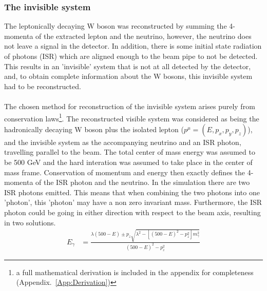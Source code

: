 \subsubsection{The invisible system}
\label{SUBSUBSEC:ISRImplementation}
The leptonically decaying W boson was reconstructed by summing the 4-momenta of the extracted lepton and the neutrino, however, the neutrino does not leave a signal in the detector. In addition, there is some initial state radiation of photons (ISR) which are aligned enough to the beam pipe to not be detected. This results in an 'invisible' system that is not at all detected by the detector, and, to obtain complete information about the W bosons, this invisible system had to be reconstructed.
\\\\
The chosen method for reconstruction of the invisible system arises purely from conservation laws\footnote{ a full mathematical derivation is included in the appendix for completeness (Appendix.~\ref{App:Derivation})}. The reconstructed visible system was considered as being the hadronically decaying W boson plus the isolated lepton (${p}^{\mu} = ( E,  {p}_{x}, {p}_{y}, {p}_{z})$), and the invisible system as the accompanying neutrino and an ISR photon, travelling parallel to the beam. The total center of mass energy was assumed to be 500 GeV and the hard interation was assumed to take place in the center of mass frame. Conservation of momentum and energy then exactly defines the 4-momenta of the ISR photon and the neutrino. In the simulation there are two ISR photons emitted. This means that when combining the two photons into one 'photon', this 'photon' may have a non zero invariant mass. Furthermore, the ISR photon could be going in either direction with respect to the beam axis, resulting in two solutions.
\begin{align}
\label{EQ:Full}
{E}_{\gamma}    &= \frac{{\lambda}(500 - E)  \pm {p}_{z}\sqrt{ {\lambda}^{2} - [{(500 - E)}^{2} -{p}_{z}^{2}]{m}_{\gamma}^{2}}}{{(500 - E)}^{2} -   {p}_{z}^{2}}
   \end{align}

